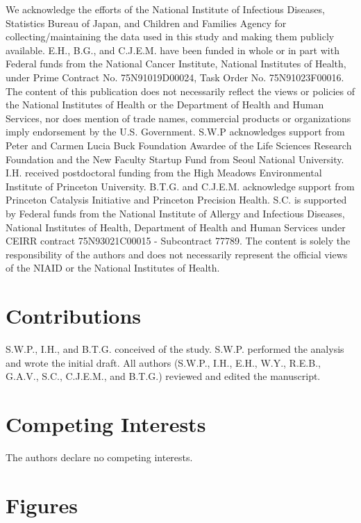 \documentclass[12pt]{article}
\begin{document}
We acknowledge the efforts of the National Institute of Infectious Diseases, Statistics Bureau of Japan, and Children and Families Agency for collecting/maintaining the data used in this study and making them publicly available.
E.H., B.G., and C.J.E.M. have been funded in whole or in part with Federal funds from the National Cancer Institute, National Institutes of Health, under Prime Contract No. 75N91019D00024, Task Order No. 75N91023F00016. 
The content of this publication does not necessarily reflect the views or policies of the National Institutes of Health or the Department of Health and Human Services, nor does mention of trade names, commercial products or organizations imply endorsement by the U.S. Government.
S.W.P acknowledges support from Peter and Carmen Lucia Buck Foundation Awardee of the Life Sciences Research Foundation and the New Faculty Startup Fund from Seoul National University.
I.H. received postdoctoral funding from the High Meadows Environmental Institute of Princeton University.
B.T.G. and C.J.E.M. acknowledge support from Princeton Catalysis Initiative and Princeton Precision Health.
S.C. is supported by Federal funds from the National Institute of Allergy and Infectious Diseases, National Institutes of Health, Department of Health and Human Services under CEIRR contract 75N93021C00015 - Subcontract 77789.
The content is solely the responsibility of the authors and does not necessarily represent the official views of the NIAID or the National Institutes of Health. 

\section*{Contributions}

S.W.P., I.H., and B.T.G. conceived of the study. S.W.P. performed the analysis and wrote the initial draft. All authors (S.W.P., I.H., E.H., W.Y., R.E.B., G.A.V., S.C., C.J.E.M., and B.T.G.) reviewed and edited the manuscript.

\section*{Competing Interests}

The authors declare no competing interests.

\section*{Figures}
\end{document}
